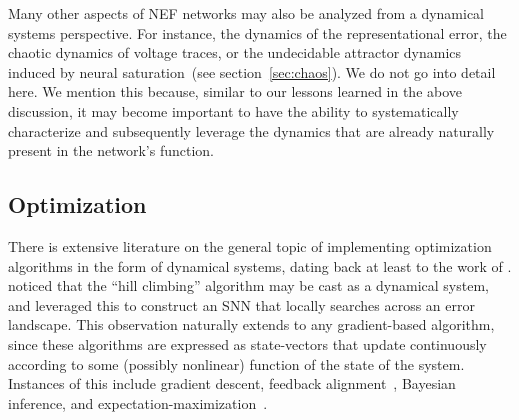 Many other aspects of NEF networks may also be analyzed from a dynamical systems perspective.
For instance, the dynamics of the representational error, the chaotic dynamics of voltage traces, or the undecidable attractor dynamics induced by neural saturation~(see section~\ref{sec:chaos}).
We do not go into detail here.
We mention this because, similar to our lessons learned in the above discussion, it may become important to have the ability to systematically characterize and subsequently leverage the dynamics that are already naturally present in the network's function.


\subsection{Optimization}

There is extensive literature on the general topic of implementing optimization algorithms in the form of dynamical systems, dating back at least to the work of \citet{brockett1991dynamical}.
\citet{voelkerimplementing} noticed that the ``hill climbing'' algorithm may be cast as a dynamical system, and leveraged this to construct an SNN that locally searches across an error landscape.
This observation naturally extends to any gradient-based algorithm, since these algorithms are expressed as state-vectors that update continuously according to some (possibly nonlinear) function of the state of the system. 
Instances of this include gradient descent, feedback alignment~\citep{stockel2019align}, Bayesian inference, and expectation-maximization~\citep{sharma2017}.

